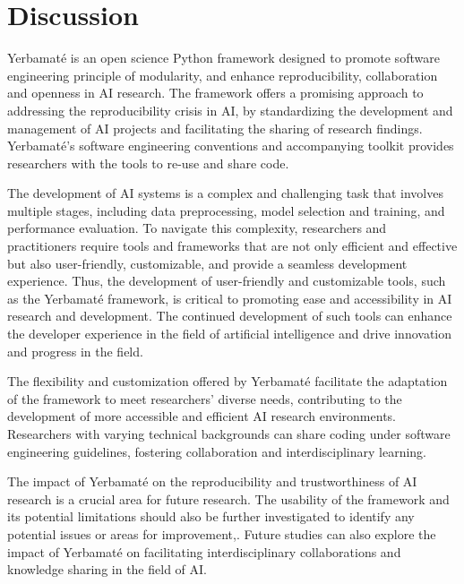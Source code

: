 \section{Discussion}

Yerbamaté is an open science Python framework designed to promote software engineering principle of modularity, and enhance reproducibility, collaboration and openness in AI research. The framework offers a promising approach to addressing the reproducibility crisis in AI, by standardizing the development and management of AI projects and facilitating the sharing of research findings. Yerbamaté's software engineering conventions and accompanying toolkit provides researchers with the tools to re-use and share code.

The development of AI systems is a complex and challenging task that involves multiple stages, including data preprocessing, model selection and training, and performance evaluation. To navigate this complexity, researchers and practitioners require tools and frameworks that are not only efficient and effective but also user-friendly, customizable, and provide a seamless development experience. Thus, the development of user-friendly and customizable tools, such as the Yerbamaté framework, is critical to promoting ease and accessibility in AI research and development. The continued development of such tools can enhance the developer experience in the field of artificial intelligence and drive innovation and progress in the field.


The flexibility and customization offered by Yerbamaté facilitate the adaptation of the framework to meet researchers' diverse needs, contributing to the development of more accessible and efficient AI research environments. Researchers with varying technical backgrounds can share coding under software engineering guidelines, fostering collaboration and interdisciplinary learning.

The impact of Yerbamaté on the reproducibility and trustworthiness of AI research is a crucial area for future research. The usability of the framework and its potential limitations should also be further investigated to identify any potential issues or areas for improvement,. Future studies can also explore the impact of Yerbamaté on facilitating interdisciplinary collaborations and knowledge sharing in the field of AI.

 
